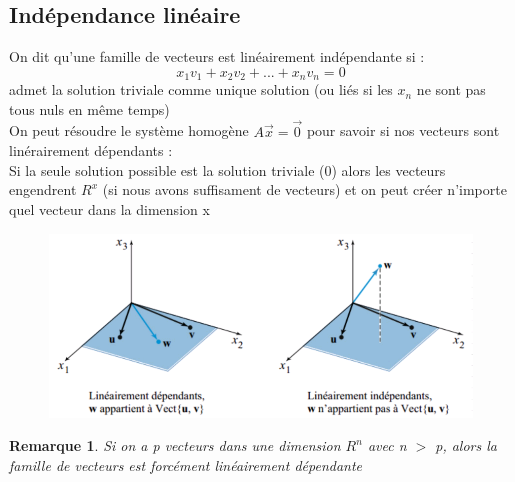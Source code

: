 \documentclass{article}
\newtheorem{remark}{Remarque}[section]
\begin{document}
\subsection{Indépendance linéaire}
On dit qu'une famille de vecteurs est linéairement indépendante si :
\[ x_1v_1 + x_2v_2 + ... + x_nv_n = 0\]
admet la solution triviale comme unique solution (ou liés si les \(x_n\) ne sont pas tous nuls en même temps)\\
On peut résoudre le système homogène \( A\overrightarrow{x} = \overrightarrow{0}\) pour savoir si nos vecteurs sont linérairement dépendants : \\
Si la seule solution possible est la solution triviale (0) alors les vecteurs engendrent \(R^x\) (si nous avons suffisament de vecteurs) et on peut créer n'importe quel vecteur dans la dimension x
\begin{figure}[htp]
    \centering
    \includegraphics[width=12cm]{Images/linéarité.png}
    \label{fig:linearite}
\end{figure}
\begin{remark}
    Si on a p vecteurs dans une dimension \(R^n\) avec n \(>\) p, alors la famille de vecteurs est forcément linéairement dépendante 
\end{remark}
\end{document}
